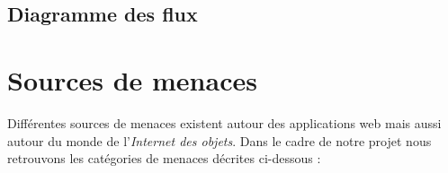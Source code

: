 \documentclass[12pt]{article}
\begin{document}
\subsection{Diagramme des flux}
\label{ssec:diagramme}

\section{Sources de menaces}

Différentes sources de menaces existent autour des applications web mais aussi autour du monde de l'\emph{Internet des objets}. Dans le cadre de notre projet nous retrouvons les catégories de menaces décrites ci-dessous :
\end{document}
